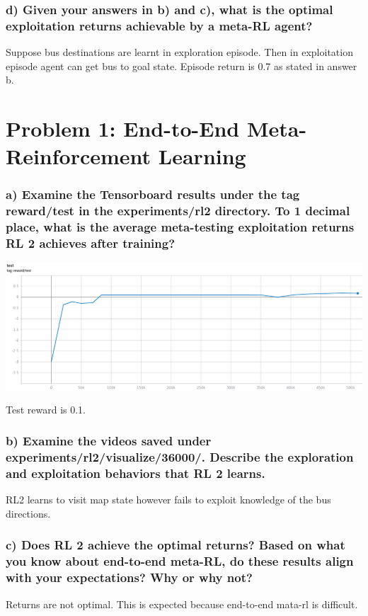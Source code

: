 \documentclass[12pt]{article}
\begin{document}
\subsubsection*{d) Given your answers in b) and c), what is the optimal exploitation returns achievable by a meta-RL agent?}

Suppose bus destinations are learnt in exploration episode.
Then in exploitation episode agent can get bus to goal state. Episode return is 0.7 as stated in answer b.


\newpage
\section*{Problem 1: End-to-End Meta-Reinforcement Learning}

\subsubsection*{a) Examine the Tensorboard results under the tag reward/test in the experiments/rl2 directory. To 1 decimal place, what is the average meta-testing exploitation returns RL 2 achieves after training?}
\includegraphics{figures/rl2-test-return}

Test reward is 0.1.

\subsubsection*{b) Examine the videos saved under experiments/rl2/visualize/36000/. Describe the exploration and exploitation behaviors that RL 2 learns.}
RL2 learns to visit map state however fails to exploit knowledge of the bus directions.

\subsubsection*{c) Does RL 2 achieve the optimal returns? Based on what you know about end-to-end meta-RL, do these results align with your expectations? Why or why not?}
Returns are not optimal.
This is expected because end-to-end mata-rl is difficult.
\end{document}
